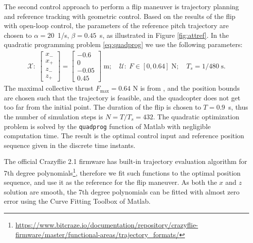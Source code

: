 The second control approach to perform a flip maneuver is trajectory planning and reference tracking with geometric control. Based on the results of the flip with open-loop control, the parameters of the reference pitch trajectory are chosen to $\alpha=20$~1/s, $\beta=0.45$~s, as illustrated in Figure \ref{fig:attref}. In the quadratic programming problem \eqref{eq:quadprog} we use the following parameters:
\begin{align}
    \mathcal{X}:\;\begin{bmatrix} x_- \\ x_+ \\ z_- \\ z_+ \end{bmatrix} =  \begin{bmatrix} -0.6 \\ 0 \\ -0.05 \\ 0.45 \end{bmatrix}\;\mathrm{m};\quad \mathcal{U}:\;F \in [0,0.64]\;\mathrm{N}; \quad T_s = 1/480\;\mathrm{s}.
\end{align}
The maximal collective thrust $F_\mathrm{max}=0.64$ N is from \cite{Forster}, and the position bounds are chosen such that the trajectory is feasible, and the quadcopter does not get too far from the initial point. The duration of the flip is chosen to $T=0.9$~s, thus the number of simulation steps is $N=T/T_s=432$. The quadratic optimization problem is solved by the \verb+quadprog+ function of Matlab with negligible computation time. The result is the optimal control input and reference position sequence given in the discrete time instants.

The official Crazyflie 2.1 firmware has built-in trajectory evaluation algorithm for 7th degree polynomials\footnote{\url{https://www.bitcraze.io/documentation/repository/crazyflie-firmware/master/functional-areas/trajectory_formats/}}, therefore we fit such functions to the optimal position sequence, and use it as the reference for the flip maneuver. As both the $x$ and $z$ solution are smooth, the 7th degree polynomials can be fitted with almost zero error using the Curve Fitting Toolbox of Matlab.

